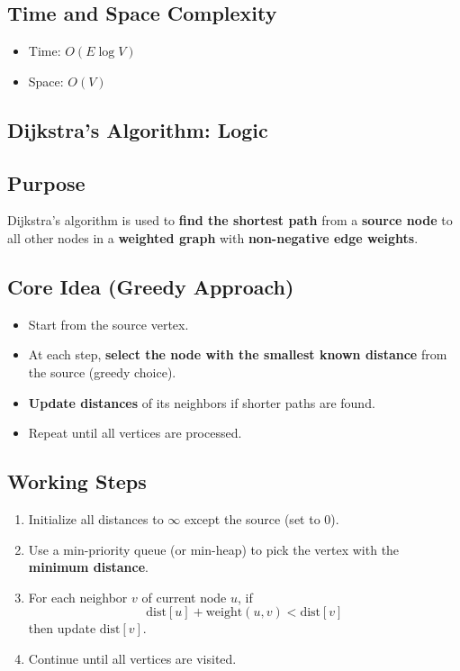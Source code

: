 \documentclass[a4paper,14pt]{extarticle}
\begin{document}
\subsection*{Time and Space Complexity}
\begin{itemize}
    \item Time: $O(E \log V)$
    \item Space: $O(V)$
\end{itemize}

\subsection{Dijkstra's Algorithm: Logic}
\subsection*{Purpose}
Dijkstra’s algorithm is used to \textbf{find the shortest path} from a \textbf{source node} to all other nodes in a \textbf{weighted graph} with \textbf{non-negative edge weights}.

\subsection*{Core Idea (Greedy Approach)}
\begin{itemize}
    \item Start from the source vertex.
    \item At each step, \textbf{select the node with the smallest known distance} from the source (greedy choice).
    \item \textbf{Update distances} of its neighbors if shorter paths are found.
    \item Repeat until all vertices are processed.
\end{itemize}

\subsection*{Working Steps}
\begin{enumerate}
    \item Initialize all distances to $\infty$ except the source (set to 0).
    \item Use a min-priority queue (or min-heap) to pick the vertex with the \textbf{minimum distance}.
    \item For each neighbor $v$ of current node $u$, if 
    \[
    \text{dist}[u] + \text{weight}(u, v) < \text{dist}[v]
    \]
    then update $\text{dist}[v]$.
    \item Continue until all vertices are visited.
\end{enumerate}
\end{document}
